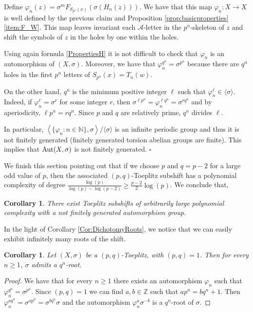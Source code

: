 \documentclass{daj}
\theoremstyle{plain}
\newtheorem{corollary}[theorem]{Corollary}
\theoremstyle{definition}
\begin{document}
Define $\varphi_{n}(z)=\sigma^{m}F_{S_{p^n}(x)}(\sigma(H_{n}(z)))$.  We have that this map $\varphi_n: X \to X$ is well defined by the previous claim and Proposition \ref{prop:basicproperties} \eqref{item:F_W}. This map leaves invariant each ${\mathcal A}$-letter in the $p^n$-skeleton of $z$ and shift the symbols of $z$ in the holes by one within the holes.

Using again formula \eqref{PropertiesH} it is not difficult to check that $\varphi_n$ is an automorphism of $(X,\sigma)$. Moreover, we have that $\varphi_n^{q^n}=\sigma^{p^n}$ because there are $q^n$ holes in the first $p^n$ letters of $S_{p^n}(x)=T_n(w)$. 


On the other hand, $q^n$ is the minimum positive integer $\ell$ such that $\varphi_n^{\ell}\in \langle \sigma \rangle$. 
Indeed, if $\varphi_n^{\ell}=\sigma^{r}$ for some integer $r$, then $\sigma^{\ell p^n}=\varphi_n^{\ell q^n}=\sigma^{rq^n}$ and by aperiodicity, $\ell p^n=r q^n$. 
Since $p$ and $q$ are relatively  prime,  $ q^n$ divides $\ell$.

In particular, $\left \langle \{\varphi_n: n\in \mathbb{N} \}, \sigma \right \rangle/\langle \sigma \rangle$ is an infinite periodic group and thus it is not finitely generated (finitely generated torsion abelian groups are finite). This implies that ${\rm Aut}(X,\sigma)$ is not finitely generated. 
$\square$
\smallskip

We finish this section pointing out that if we choose $p$ and $q=p-2$ for a large odd value of $p$, then the associated $(p,q)$-Toeplitz subshift has a polynomial complexity of degree ${\frac{\log(p)}{\log(p)-\log(p-2)}\geq \frac{p-2}{2} \log(p)}$. We conclude that,

\begin{corollary}\label{cor:arbitrary}
	There exist Toeplitz subshifts of arbitrarily large polynomial complexity with a not finitely generated automorphism group.
\end{corollary}

In the light of Corollary \ref{Cor:DichotomyRoots}, we notice that we can easily exhibit infinitely many roots of the shift. 
\begin{corollary}
	Let $(X,\sigma)$ be a $(p,q)$-Toeplitz, with $(p,q)=1$. Then for every $n\geq 1$, $\sigma$ admits a $q^n$-root.	
\end{corollary}

\begin{proof}
	We have that for every $n\geq 1$ there exists an automorphism $\varphi_n$ such that $\varphi_n^{q^n}=\sigma^{p^n}$. Since $(p,q)=1$ we can find $a,b\in \mathbb{Z}$ such that $ap^n=bq^n+1$. Then $\varphi_n^{aq^n}=\sigma^{ap^n}=\sigma^{bq^n}\sigma$ and the automorphism $\varphi_n^a\sigma^{-b}$ is a $q^n$-root of $\sigma$.    	
\end{proof}
\end{document}

